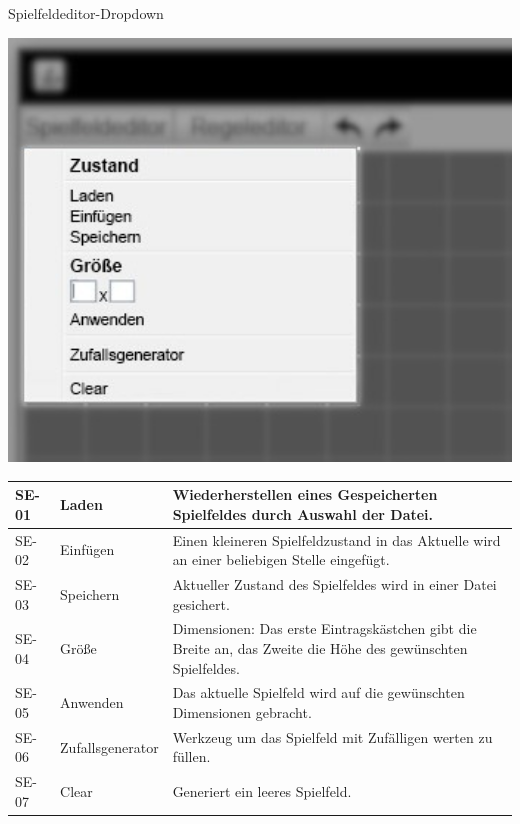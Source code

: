 \documentclass[11pt,a4paper]{article}
\begin{document}
	
\pagebreak
\par
    Spielfeldeditor-Dropdown %
    \par
    \includegraphics[width=15cm]{spielfeldeditor_dropdown_edit.jpeg} %

    \begin{longtable}[m]{|m{2cm}|m{4cm}|m{9cm}|} %
        \hline
        SE-01 & Laden & Wiederherstellen eines Gespeicherten Spielfeldes durch Auswahl der Datei. \\
        \hline
        SE-02 & Einfügen & Einen kleineren Spielfeldzustand in das Aktuelle wird an einer beliebigen Stelle eingefügt. \\
        \hline
        SE-03 & Speichern & Aktueller Zustand des Spielfeldes wird in einer Datei gesichert. \\
        \hline
        SE-04 & Größe & Dimensionen: Das erste Eintragskästchen gibt die Breite an, das Zweite die Höhe des gewünschten Spielfeldes.\\
        \hline
        SE-05 & Anwenden & Das aktuelle Spielfeld wird auf die gewünschten Dimensionen gebracht. \\
        \hline
        SE-06 & Zufallsgenerator & Werkzeug um das Spielfeld mit Zufälligen werten zu füllen.\\
        \hline
        SE-07 & Clear & Generiert ein leeres Spielfeld.\\
        \hline
    \end{longtable}
    
\end{document}
